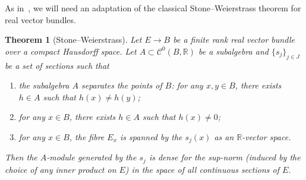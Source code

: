 \documentclass[a4paper]{amsart}
\newcommand{\bR}{\mathbb R}
\newcommand{\cC}{\mathcal C}
\theoremstyle{plain}
\newtheorem{theorem}{Theorem}[section]
\theoremstyle{definition}
\begin{document}
As in~\cite{mostovoy_spaces_2006}, we will need an adaptation of the classical Stone--Weierstrass theorem for real vector bundles.
\begin{theorem}[Stone--Weierstrass]\label{thm:StoneWeiestrass}
Let $E \to B$ be a finite rank real vector bundle over a compact Hausdorff space. Let $A \subset \cC^0(B,\bR)$ be a subalgebra and $\{s_j\}_{j\in J}$ be a set of sections such that
\begin{enumerate}
    \item the subalgebra $A$ separates the points of $B$: for any $x,y \in B$, there exists $h \in A$ such that $h(x) \neq h(y)$;
    \item for any $x \in B$, there exists $h \in A$ such that $h(x) \neq 0$;
    \item for any $x\in B$, the fibre $E_x$ is spanned by the $s_j(x)$ as an $\bR$-vector space.
\end{enumerate}
Then the $A$-module generated by the $s_j$ is dense for the sup-norm (induced by the choice of any inner product on $E$) in the space of all continuous sections of $E$.
\end{theorem}
\end{document}
